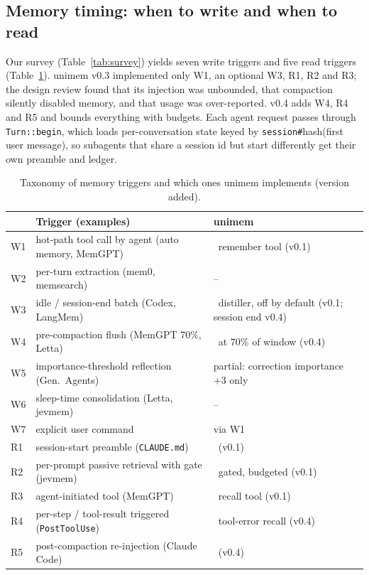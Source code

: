 \documentclass[10pt,twocolumn]{article}
\newcommand{\sys}{\textsf{unimem}}
\newcommand{\code}[1]{\texttt{\small #1}}
\newcommand{\yes}{\checkmark}
\begin{document}
\subsection{Memory timing: when to write and when to read}
\label{sec:timing}

Our survey (Table~\ref{tab:survey}) yields seven write triggers and five read triggers (Table~\ref{tab:taxonomy}).
\sys{} v0.3 implemented only W1, an optional W3, R1, R2 and R3; the design review found that its injection was
unbounded, that compaction silently disabled memory, and that usage was over-reported. v0.4 adds W4, R4 and R5 and
bounds everything with budgets. Each agent request passes through \code{Turn::begin}, which loads per-conversation
state keyed by \code{session\#}hash(first user message), so subagents that share a session id but start differently
get their own preamble and ledger.

\begin{table}[t]
\centering\scriptsize
\caption{Taxonomy of memory triggers and which ones \sys{} implements (version added).}
\label{tab:taxonomy}
\setlength{\tabcolsep}{3pt}
\begin{tabularx}{\columnwidth}{@{}l>{\raggedright\arraybackslash}X>{\raggedright\arraybackslash}p{2.35cm}@{}}
\toprule
& Trigger (examples) & \sys{} \\
\midrule
W1 & hot-path tool call by agent (auto memory, MemGPT) & \yes\ remember tool (v0.1) \\
W2 & per-turn extraction (mem0, memsearch) & -- \\
W3 & idle / session-end batch (Codex, LangMem) & \yes\ distiller, off by default (v0.1; session end v0.4) \\
W4 & pre-compaction flush (MemGPT 70\%, Letta) & \yes\ at 70\% of window (v0.4) \\
W5 & importance-threshold reflection (Gen.\ Agents) & partial: correction importance $+3$ only \\
W6 & sleep-time consolidation (Letta, jevmem) & -- \\
W7 & explicit user command & via W1 \\
\midrule
R1 & session-start preamble (\code{CLAUDE.md}) & \yes\ (v0.1) \\
R2 & per-prompt passive retrieval with gate (jevmem) & \yes\ gated, budgeted (v0.1) \\
R3 & agent-initiated tool (MemGPT) & \yes\ recall tool (v0.1) \\
R4 & per-step / tool-result triggered (\code{PostToolUse}) & \yes\ tool-error recall (v0.4) \\
R5 & post-compaction re-injection (Claude Code) & \yes\ (v0.4) \\
\bottomrule
\end{tabularx}
\end{table}
\end{document}
